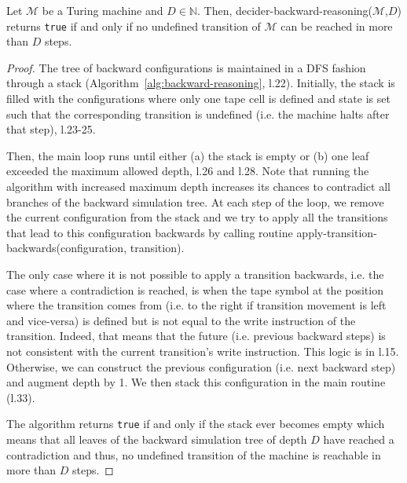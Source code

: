 \begin{theorem}\label{th:backward-reasoning}
  Let $\mathcal{M}$ be a Turing machine and $D\in\mathbb{N}$.
  Then, {\sc decider-backward-reasoning}($\mathcal{M}$,$D$) returns \texttt{true} if and only if no undefined transition of $\mathcal{M}$ can be reached in more than $D$ steps.
\end{theorem}
\begin{proof}
  The tree of backward configurations is maintained in a DFS fashion through a stack (Algorithm~\ref{alg:backward-reasoning}, l.22). Initially, the stack is filled with the configurations where only one tape cell is defined and state is set such that the corresponding transition is undefined (i.e. the machine halts after that step), l.23-25.

  Then, the main loop runs until either (a) the stack is empty or (b) one leaf exceeded the maximum allowed depth, l.26 and l.28. Note that running the algorithm with increased maximum depth increases its chances to contradict all branches of the backward simulation tree. At each step of the loop, we remove the current configuration from the stack and we try to apply all the transitions that lead to this configuration backwards by calling routine {\sc apply-transition-backwards}(configuration, transition).

  The only case where it is not possible to apply a transition backwards, i.e. the case where a contradiction is reached, is when the tape symbol at the position where the transition comes from (i.e. to the right if transition movement is left and vice-versa) is defined but is not equal to the write instruction of the transition. Indeed, that means that the future (i.e. previous backward steps) is not consistent with the current transition's write instruction. This logic is in l.15. Otherwise, we can construct the previous configuration (i.e. next backward step) and augment depth by 1. We then stack this configuration in the main routine (l.33).

  The algorithm returns \texttt{true} if and only if the stack ever becomes empty which means that all leaves of the backward simulation tree of depth $D$ have reached a contradiction and thus, no undefined transition of the machine is reachable in more than $D$ steps.
\end{proof}

